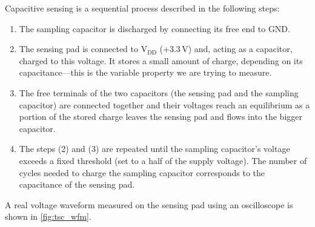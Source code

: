 \noindent
Capacitive sensing is a sequential process described in the following steps:

\begin{enumerate}
	\item The sampling capacitor is discharged by connecting its free end to \gls{GND}.
	\item The sensing pad is connected to V$_\mathrm{DD}$ (+3.3\,V) and, acting as a capacitor, charged to this voltage. It stores a small amount of charge, depending on its capacitance---this is the variable property we are trying to measure.
	\item The free terminals of the two capacitors (the sensing pad and the sampling capacitor) are connected together and their voltages reach an equilibrium as a portion of the stored charge leaves the sensing pad and flows into the bigger capacitor.
	\item The steps (2) and (3) are repeated until the sampling capacitor's voltage exceeds a fixed threshold (set to a half of the supply voltage). The number of cycles needed to charge the sampling capacitor corresponds to the capacitance of the sensing pad.
\end{enumerate}

\noindent
A real voltage waveform measured on the sensing pad using an oscilloscope is shown in \cref{fig:tsc_wfm}.

